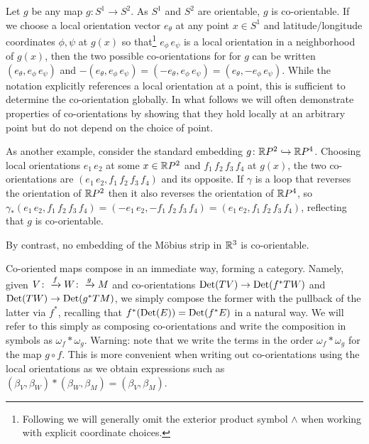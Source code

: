 \begin{example}
	Let $g$ be any map $g \colon S^1 \to S^2$.
	As $S^1$ and $S^2$ are orientable, $g$ is co-orientable.
	If we choose a local orientation vector $e_{\theta}$ at any point $x \in S^1$ and latitude/longitude coordinates $\phi,\psi$ at $g(x)$ so that\footnote{Following \cite{BoTu82} we will generally omit the exterior product symbol $\wedge$ when working with explicit coordinate choices.} $e_\phi\, e_\psi$ is a local orientation in a neighborhood of $g(x)$, then the two possible co-orientations for for $g$ can be written $(e_\theta, e_\phi\, e_\psi)$ and $-(e_\theta, e_\phi\, e_\psi) = (-e_\theta, e_\phi \,e_\psi) = (e_\theta,- e_\phi\, e_\psi)$.
	While the notation explicitly references a local orientation at a point, this is sufficient to determine the co-orientation globally.
	In what follows we will often demonstrate properties of co-orientations by showing that they hold locally at an arbitrary point but do not depend on the choice of point.

	As another example, consider the standard embedding $g \colon \mathbb{R} P^2 \hookrightarrow \mathbb{R} P^4$.
	Choosing local orientations $e_1\, e_2$ at some $x \in \mathbb{R} P^2$ and $f_1\,f_2\,f_3\,f_4$ at $g(x)$, the two co-orientations are $(e_1\,e_2, f_1\,f_2\,f_3\,f_4)$ and its opposite.
	If $\gamma$ is a loop that reverses the orientation of $\mathbb{R} P^2$ then it also reverses the orientation of $\mathbb{R} P^4$, so $\gamma_*(e_1\,e_2, f_1\,f_2\,f_3\,f_4) = (-e_1\,e_2,- f_1\,f_2\,f_3\,f_4) = (e_1\,e_2, f_1\,f_2\,f_3\,f_4)$, reflecting that $g$ is co-orientable.

	By contrast, no embedding of the M\"obius strip in $\mathbb{R}^3$ is co-orientable.
\end{example}

\begin{remark}\label{R: cooriented composition}
	Co-oriented maps compose in an immediate way, forming a category.
	Namely, given $V\colon\xrightarrow{f} W\colon\xrightarrow{g} M$ and co-orientations ${\rm Det}(TV) \to {\rm Det}(f^*TW)$ and ${\rm Det}(TW) \to {\rm Det}(g^*TM)$, we simply compose the former with the pullback of the latter via $f^*$, recalling that $f^*({\rm Det}(E)) = {\rm Det}(f^*E)$ in a natural way.
	We will refer to this simply as composing co-orientations and write the composition in symbols as $\omega_f*\omega_g$.
	Warning: note that we write the terms in the order $\omega_f*\omega_g$ for the map $g \circ f$.
	This is more convenient when writing out co-orientations using the local orientations as we obtain expressions such as $(\beta_V, \beta_W)*(\beta_W,\beta_M) = (\beta_V,\beta_M)$.
\end{remark}

